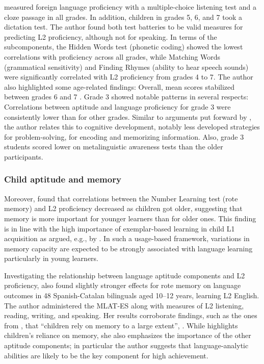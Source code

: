 \documentclass[output=paper]{langscibook}
\begin{document}
\citet{SuarezVilagran2010} measured foreign language proficiency with a multiple-choice listening test and a cloze passage in all grades. In addition, children in grades 5, 6, and 7 took a dictation test. The author found both test batteries to be valid measures for predicting L2 proficiency, although not for speaking. In terms of the subcomponents, the Hidden Words test (phonetic coding) showed the lowest correlations with proficiency across all grades, while Matching Words (grammatical sensitivity) and Finding Rhymes (ability to hear speech sounds) were significantly correlated with L2 proficiency from grades 4 to 7. The author also highlighted some age-related findings: Overall, mean scores stabilized between grades 6 and 7 \citep[349]{SuarezVilagran2010}. Grade 3 showed notable patterns in several respects: Correlations between aptitude and language proficiency for grade 3 were consistently lower than for other grades. Similar to arguments put forward by \citet{Kiss2009}, the author relates this to cognitive development, notably less developed strategies for problem-solving, for encoding and memorizing information. Also, grade 3 students scored lower on metalinguistic awareness tests than the older participants.

\subsubsection{Child aptitude and memory}\label{sec:01:2.2.3} %

Moreover, \citet{SuarezVilagran2010} found that correlations between the Number Learning test (rote memory) and L2 proficiency decreased as children got older, suggesting that memory is more important for younger learners than for older ones. This finding is in line with the high importance of exemplar-based learning in child L1 acquisition as argued, e.g., by \citet{Tomasello2005}. In such a usage-based framework, variations in memory capacity are expected to be strongly associated with language learning particularly in young learners.

Investigating the relationship between language aptitude components and L2 proficiency, \citet{Munoz2014} also found slightly stronger effects for rote memory on language outcomes in 48 Spanish-Catalan bilinguals aged 10--12 years, learning L2 English. The author administered the MLAT-ES along with measures of L2 listening, reading, writing, and speaking. Her results corroborate findings, such as the ones from \citet{SuarezVilagran2010}, that “children rely on memory to a large extent”, \citep[64]{Munoz2014}. While \citet{Munoz2014} highlights children’s reliance on memory, she also emphasizes the importance of the other aptitude components; in particular the author suggests that language-analytic abilities are likely to be the key component for high achievement. 
\end{document}

